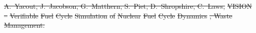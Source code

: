 \documentclass[preprint]{elsarticle}
\providecommand{\DIFdeltex}[1]{{\protect\color{red}\sout{#1}}}                      %
\providecommand{\DIFaddbegin}{} %
\providecommand{\DIFaddend}{} %
\providecommand{\DIFdelend}{} %
\providecommand{\DIFdel}[1]{\texorpdfstring{\DIFdeltex{#1}}{}} %
\begin{document}
\DIFdel{A.~Yacout, J.~Jacobson, G.~Matthern, S.~Piet, D.~Shropshire, C.~Laws,
  }%
\DIFdel{VISION}%
\DIFdel{–}%
\DIFdel{Verifiable}%
\DIFdel{Fuel}%
\DIFdel{Cycle}%
\DIFdel{Simulation}%
\DIFdel{of }%
\DIFdel{Nuclear}%
\DIFdel{Fuel}%
\DIFdel{Cycle}%
\DIFdel{Dynamics}%
\DIFdel{, Waste Management.
}%

\DIFdelend \DIFaddbegin 
\DIFaddend 

%
\end{document}
